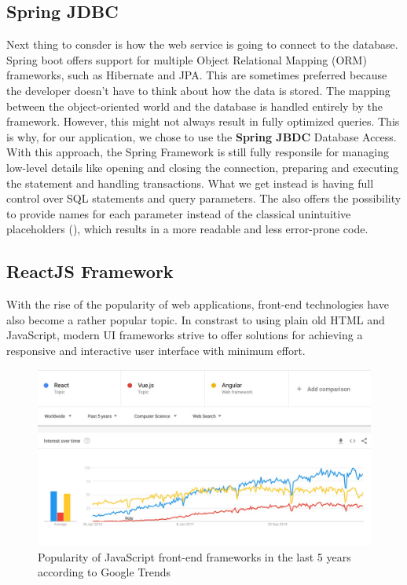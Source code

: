 \subsection{Spring JDBC}
\label{section:springJdbc}

Next thing to consder is how the web service is going to connect to the database. Spring boot offers support for multiple Object Relational Mapping (ORM) frameworks, such as Hibernate and JPA. This are sometimes preferred because the developer doesn't have to think about how the data is stored. The mapping between the object-oriented world and the database is handled entirely by the framework. However, this might not always result in fully optimized queries. This is why, for our application, we chose to use the \textbf{Spring JBDC} Database Access. With this approach, the Spring Framework is still fully responsile for managing low-level details like opening and closing the connection, preparing and executing the statement and handling transactions. What we get instead is having full control over SQL statements and query parameters. The  also offers the possibility to provide names for each parameter instead of the classical unintuitive placeholders (), which results in a more readable and less error-prone code.


\subsection{ReactJS Framework}
\label{section:reactJSFramework}

With the rise of the popularity of web applications, front-end technologies have also become a rather popular topic. In constrast to using plain old HTML and JavaScript, modern UI frameworks strive to offer solutions for achieving a responsive and interactive user interface with minimum effort.

\begin{figure}[H]
    \centering
    \includegraphics[width=6.5in]{images/jsWebFrameworksTrends}
    \caption{Popularity of JavaScript front-end frameworks in the last 5 years according to Google Trends}
    \label{jsWebFrameworksTrends}
\end{figure}

